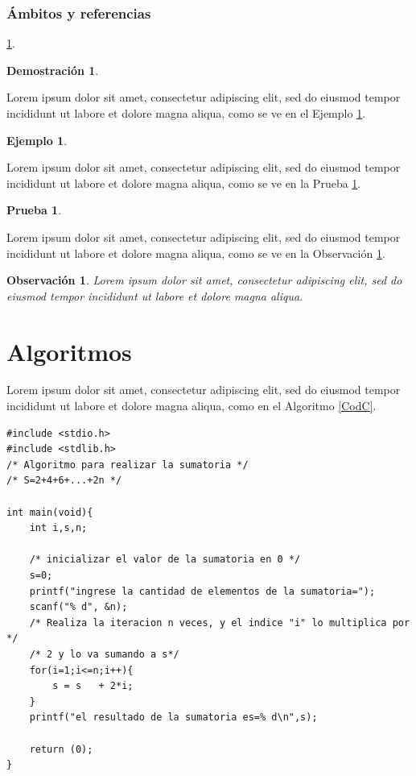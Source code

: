 \documentclass[letter,12pt]{report}
\newtheorem{ejemplo}{Ejemplo}
\newtheorem{prueba}{Prueba}
\newtheorem{demo}{Demostración}
\newtheorem{obs}{Observación}
\begin{document}
\subsubsection{Ámbitos y referencias}

    \blindtext %
\ref{dem:01}.
\begin{demo}\label{dem:01}
\blindtext %
\end{demo}

    Lorem ipsum dolor sit amet, consectetur adipiscing elit, sed do eiusmod tempor incididunt ut labore et dolore magna aliqua, como se ve en el Ejemplo \ref{ej:a}.

\begin{ejemplo}\label{ej:a}
    \blindtext %

\end{ejemplo}

    Lorem ipsum dolor sit amet, consectetur adipiscing elit, sed do eiusmod tempor incididunt ut labore et dolore magna aliqua, como se ve en la Prueba \ref{pru:01}.
\begin{prueba}\label{pru:01}
   \blindtext %

\end{prueba}


    Lorem ipsum dolor sit amet, consectetur adipiscing elit, sed do eiusmod tempor incididunt ut labore et dolore magna aliqua, como se ve en la Observación \ref{ob:01}.
\begin{obs}\label{ob:01}
    Lorem ipsum dolor sit amet, consectetur adipiscing elit, sed do eiusmod tempor incididunt ut labore et dolore magna aliqua.
\end{obs}


\section{Algoritmos}\label{A:alg}
\blindtext %

Lorem ipsum dolor sit amet, consectetur adipiscing elit, sed do eiusmod tempor incididunt ut labore et dolore magna aliqua, como en el Algoritmo \ref{CodC}.

\lstset{language=C}
\begin{lstlisting}[caption = C\'odigo en C de una sumatoria, label = CodC]
#include <stdio.h>
#include <stdlib.h>
/* Algoritmo para realizar la sumatoria */
/* S=2+4+6+...+2n */

int main(void){
	int i,s,n;
	
	/* inicializar el valor de la sumatoria en 0 */
	s=0;
	printf("ingrese la cantidad de elementos de la sumatoria=");
	scanf("% d", &n);
	/* Realiza la iteracion n veces, y el indice "i" lo multiplica por */
	/* 2 y lo va sumando a s*/
	for(i=1;i<=n;i++){
		s = s	+ 2*i;
	} 
	printf("el resultado de la sumatoria es=% d\n",s);

	return (0);
}
\end{lstlisting}
\end{document}
